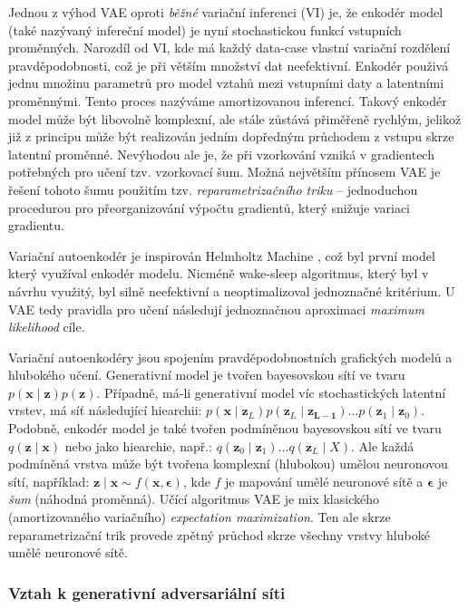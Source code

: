 Jednou z výhod VAE oproti \emph{běžné} variační inferenci (VI) je, že enkodér model (také nazývaný infereční model) je nyní stochastickou funkcí vstupních proměnných.
Narozdíl od VI, kde má každý data-case vlastní variační rozdělení pravděpodobnosti, což je při větším množství dat neefektivní.
Enkodér použivá jednu množinu parametrů pro model vztahů mezi vstupními daty a latentními proměnnými. Tento proces nazýváme amortizovanou inferencí.
Takový enkodér model může být libovolně komplexní, ale stále zůstává přiměřeně rychlým, jelikož již z principu může být realizován jedním dopředným průchodem z vstupu skrze latentní proměnné.
Nevýhodou ale je, že při vzorkování vzniká v gradientech potřebných pro učení tzv. vzorkovací šum. Možná největším přínosem VAE je řešení tohoto šumu použitím tzv. \emph{reparametrizačního triku} – jednoduchou procedurou pro přeorganizování výpočtu gradientů, který snižuje variaci gradientu.

Variační autoenkodér je inspirován Helmholtz Machine \cite{Dayan1995}, což byl první model který využíval enkodér modelu.
Nicméně wake-sleep algoritmus, který byl v návrhu využitý, byl silně neefektivní a neoptimalizoval jednoznačné kritérium.
U VAE tedy pravidla pro učení následují jednoznačnou aproximaci \emph{maximum likelihood} cíle.

Variační autoenkodéry jsou spojením pravděpodobnostních grafických modelů a hlubokého učení.
Generativní model je tvořen bayesovskou sítí ve tvaru $p(\mathbf{x}\mid\mathbf{z})p(\mathbf{z})$. Případně, má-li generativní model víc stochastických latentní vrstev, má síť následující hiearchii: $p(\mathbf{x}\mid\mathbf{z}_L) p(\mathbf{z}_L\mid\mathbf{z_{L-1}}) \dots p(\mathbf{z}_1\mid\mathbf{z}_0)$.
Podobně, enkodér model je také tvořen podmíněnou bayesovskou sítí ve tvaru $q(\mathbf{z}\mid\mathbf{x})$ nebo jako hiearchie, např.: $q(\mathbf{z}_0\mid\mathbf{z}_1) \dots q(\mathbf{z}_L \mid X)$.
Ale každá podmíněná vrstva může být tvořena komplexní (hlubokou) umělou neuronovou sítí, například: $\mathbf{z}\mid\mathbf{x} \sim f(\mathbf{x}, \mathbf{\epsilon})$, kde $f$ je mapování umělé neuronové sítě a $\mathbf{\epsilon}$ je \emph{šum} (náhodná proměnná).
Učící algoritmus VAE je mix klasického (amortizovaného variačního) \emph{expectation maximization}. Ten ale skrze reparametrizační trik provede zpětný průchod skrze všechny vrstvy hluboké umělé neuronové sítě.


\subsubsection{Vztah k generativní adversariální síti}